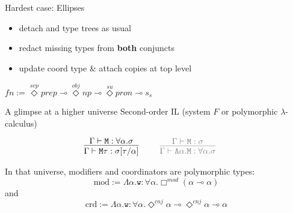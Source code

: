 \documentclass{beamer}
\newcommand{\term}[1]{\ensuremath{\mathtt{#1}}}
\newcommand{\li}{\!\multimap\!}
\begin{document}
\begin{frame}{Hardest case: Ellipses}
	\begin{minipage}{0.58\textwidth}
	\scriptsize
	\begin{itemize}
	\item 	detach and type trees as usual
	\item 	redact missing types from \textbf{both} conjuncts
	\item update coord type \& attach copies at top level
	\end{itemize}
	\end{minipage}%
	\begin{minipage}{0.42\textwidth}
	\scriptsize
	\begin{flushright}
		$fn := \overset{svp}{\Diamond}prep \li \overset{obj}{\Diamond}{np}\li \overset{su}{\Diamond}pron \li s_s$
	\end{flushright}
	\end{minipage}
\end{frame}

\begin{frame}{A glimpse at a higher universe}
\small
	Second-order IL (system $F$ or polymorphic $\lambda$-calculus)
	
	\begin{align*}
		\infer[]{\Gamma \vdash \term{M\tau}: \sigma[\tau/ \alpha]}{\Gamma \vdash \term{M}: \forall \alpha.\sigma}
		&
		\qquad
		\textcolor{gray}{
		\infer[]{\Gamma \vdash \term{\Lambda \alpha.M}: \forall \alpha.\sigma}{\Gamma \vdash \term{M}: \sigma}}
	\end{align*}
	
	\pause
	In that universe, modifiers and coordinators are polymorphic types:
	\[
		\text{mod} := \term{\Lambda \alpha.w} :\forall \alpha.\Box^{mod}\left(\alpha \li \alpha\right)
	\]
	and
	\[
		\text{crd} := \term{\Lambda \alpha.w} : \forall \alpha.\Diamond^{cnj}\alpha \li \Diamond^{cnj}\alpha \li \alpha
	\]
\end{frame}
\end{document}
